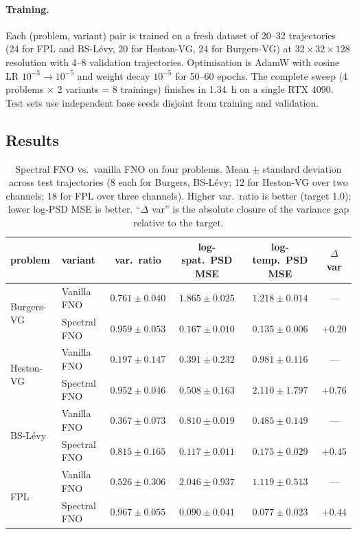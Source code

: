 \documentclass[review,12pt]{elsarticle}
\begin{document}
\paragraph{Training.}
Each (problem, variant) pair is trained on a fresh dataset of
20--32 trajectories (24 for FPL and BS-L\'evy, 20 for Heston-VG, 24 for Burgers-VG) at $32 \times 32 \times 128$ resolution with
4--8 validation trajectories. Optimisation is AdamW with cosine LR
$10^{-3} \to 10^{-5}$ and weight decay $10^{-5}$ for 50--60 epochs.
The complete sweep (4 problems $\times$ 2 variants = 8 trainings)
finishes in 1.34~h on a single RTX 4090. Test sets use independent base
seeds disjoint from training and validation.

\subsection{Results}
\label{subsec:fno-results}

\begin{table}[h]
\centering
\caption{Spectral FNO vs.\ vanilla FNO on four problems. Mean
$\pm$ standard deviation across test trajectories (8 each for
Burgers, BS-L\'evy; 12 for Heston-VG over two channels;
18 for FPL over three channels). Higher var.\ ratio is better
(target 1.0); lower log-PSD MSE is better. ``$\Delta$ var'' is
the absolute closure of the variance gap relative to the target.}
\label{tab:spectral-fno}
\begin{tabular}{l l c c c c}
\toprule
problem & variant & var.\ ratio & log-spat.\ PSD MSE & log-temp.\ PSD MSE & $\Delta$ var \\
\midrule
\multirow{2}{*}{Burgers-VG} &
  Vanilla FNO            & $0.761 \pm 0.040$ & $1.865 \pm 0.025$ & $1.218 \pm 0.014$ & --- \\
& Spectral FNO           & $\mathbf{0.959 \pm 0.053}$ & $\mathbf{0.167 \pm 0.010}$ & $\mathbf{0.135 \pm 0.006}$ & $+0.20$ \\
\midrule
\multirow{2}{*}{Heston-VG}  &
  Vanilla FNO            & $0.197 \pm 0.147$ & $0.391 \pm 0.232$ & $0.981 \pm 0.116$ & --- \\
& Spectral FNO           & $\mathbf{0.952 \pm 0.046}$ & $0.508 \pm 0.163$ & $2.110 \pm 1.797$ & $\mathbf{+0.76}$ \\
\midrule
\midrule
\multirow{2}{*}{BS-L\'evy}  &
  Vanilla FNO            & $0.367 \pm 0.073$ & $0.810 \pm 0.019$ & $0.485 \pm 0.149$ & --- \\
& Spectral FNO           & $\mathbf{0.815 \pm 0.165}$ & $\mathbf{0.117 \pm 0.011}$ & $\mathbf{0.175 \pm 0.029}$ & $+0.45$ \\
\midrule
\multirow{2}{*}{FPL}        &
  Vanilla FNO            & $0.526 \pm 0.306$ & $2.046 \pm 0.937$ & $1.119 \pm 0.513$ & --- \\
& Spectral FNO           & $\mathbf{0.967 \pm 0.055}$ & $\mathbf{0.090 \pm 0.041}$ & $\mathbf{0.077 \pm 0.023}$ & $+0.44$ \\
\bottomrule
\end{tabular}
\end{table}
\end{document}
